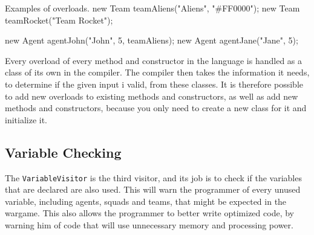 \begin{source}{Examples of overloads.}{}
	new Team teamAliens("Aliens", "#FF0000");
	new Team teamRocket("Team Rocket");
	
	new Agent agentJohn("John", 5, teamAliens);
	new Agent agentJane("Jane", 5);
\end{source}

Every overload of every method and constructor in the language is handled as a class of its own in the compiler. 
The compiler then takes the information it needs, to determine if the given input i valid, from these classes. 
It is therefore possible to add new overloads to existing methods and constructors, as well as add new methods and constructors, because you only need to create a new class for it and initialize it.

\subsection{Variable Checking}
\label{variabelcheck}
The \texttt{VariableVisitor} is the third visitor, and its job is to check if the variables that are declared are also used. 
This will warn the programmer of every unused variable, including agents, squads and teams, that might be expected in the wargame.
This also allows the programmer to better write optimized code, by warning him of code that will use unnecessary memory and processing power.